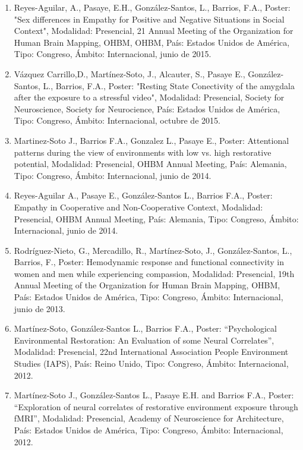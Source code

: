 \documentclass[12pt]{article}
\begin{document}
\begin{enumerate}
\item Reyes-Aguilar, A., Pasaye, E.H., González-Santos, L., Barrios, F.A., Poster: "Sex differences in Empathy for Positive and 
Negative 
Situations in Social Context", Modalidad: Presencial, 21 Annual Meeting of the Organization for Human Brain Mapping, OHBM, OHBM, País: 
Estados Unidos de América, Tipo: Congreso, Ámbito: Internacional, junio de 2015.

\item Vázquez Carrillo,D., Martínez-Soto, J., Alcauter, S., Pasaye E., González-Santos, L., Barrios, F.A., Poster: "Resting 
State 
Conectivity of the amygdala after the exposure to a stressful video", Modalidad: Presencial, Society for Neuroscience, Society for 
Neurocience, País: Estados Unidos de América, Tipo: Congreso, Ámbito: Internacional, octubre de 2015.

\item Martinez-Soto J., Barrios F.A., Gonzalez L., Pasaye E., Poster: Attentional patterns during the view of environments with low vs. 
high restorative potential, Modalidad: Presencial, OHBM Annual Meeting, País: Alemania, 
Tipo: Congreso, Ámbito: Internacional, junio de 2014.

\item Reyes-Aguilar A., Pasaye E., González-Santos L., Barrios F.A., Poster: Empathy in Cooperative and Non-Cooperative Context, 
Modalidad: Presencial, OHBM Annual Meeting, País: Alemania, Tipo: Congreso, Ámbito: Internacional, junio de 2014.

\item Rodríguez-Nieto, G., Mercadillo, R., Martínez-Soto, J., González-Santos, L., Barrios, F., Poster: Hemodynamic response and 
functional connectivity in women and men while experiencing compassion, Modalidad: Presencial, 19th Annual Meeting of the Organization 
for Human Brain Mapping, OHBM, País: Estados Unidos de América, Tipo: Congreso, Ámbito: Internacional, junio de 2013.

\item Martínez-Soto, González-Santos L., Barrios F.A., Poster: “Psychological Environmental Restoration: An Evaluation of some Neural 
Correlates”, Modalidad: Presencial, 22nd International Association People Environment Studies (IAPS), País: Reino Unido, Tipo: 
Congreso, Ámbito: Internacional, 2012.

\item Martínez-Soto J., González-Santos L., Pasaye E.H. and Barrios F.A., Poster: “Exploration of neural correlates of restorative 
environment exposure through fMRI”, Modalidad: Presencial, Academy of Neuroscience for Architecture, País: Estados Unidos de América, 
Tipo: Congreso, Ámbito: Internacional, 2012.


\end{enumerate}
\end{document}
